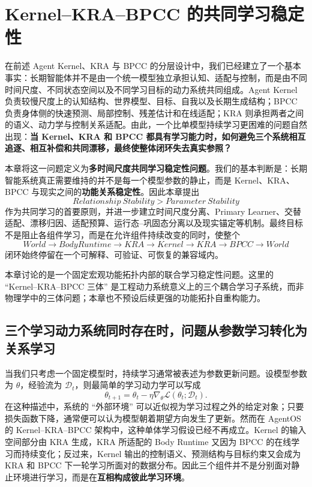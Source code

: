 \chapter{Kernel--KRA--BPCC 的共同学习稳定性}

\begin{chapterlead}
在前述 Agent Kernel、KRA 与 BPCC 的分层设计中，我们已经建立了一个基本事实：长期智能体并不是由一个统一模型独立承担认知、适配与控制，而是由不同时间尺度、不同状态空间以及不同学习目标的动力系统共同组成。Agent Kernel 负责较慢尺度上的认知结构、世界模型、目标、自我以及长期生成结构；BPCC 负责身体侧的快速预测、局部控制、残差估计和在线适配；KRA 则承担两者之间的语义、动力学与控制关系适配。由此，一个比单模型持续学习更困难的问题自然出现：\textbf{当 Kernel、KRA 和 BPCC 都具有学习能力时，如何避免三个系统相互追逐、相互补偿和共同漂移，最终使整体闭环失去真实参照？}

本章将这一问题定义为\textbf{多时间尺度共同学习稳定性问题}。我们的基本判断是：长期智能系统真正需要维持的并不是每一个模型参数的静止，而是 Kernel、KRA、BPCC 与现实之间的\textbf{功能关系稳定性}。因此本章提出
\[
\boxed{
Relationship\ Stability > Parameter\ Stability
}
\]
作为共同学习的首要原则，并进一步建立时间尺度分离、Primary Learner、交替适配、漂移归因、适配预算、运行态--巩固态分离以及现实锚定等机制。最终目标不是阻止各组件学习，而是在允许组件持续改变的同时，使整个
\[
World\rightarrow BodyRuntime\rightarrow KRA\rightarrow Kernel
\rightarrow KRA\rightarrow BPCC\rightarrow World
\]
闭环始终停留在一个可解释、可验证、可恢复的兼容域内。

本章讨论的是一个固定宏观功能拓扑内部的联合学习稳定性问题。这里的 ``Kernel--KRA--BPCC 三体'' 是工程动力系统意义上的三个耦合学习子系统，而非物理学中的三体问题；本章也不预设后续更强的功能拓扑自重构能力。
\end{chapterlead}


\section{三个学习动力系统同时存在时，问题从参数学习转化为关系学习}

当我们只考虑一个固定模型时，持续学习通常被表述为参数更新问题。设模型参数为 $\theta$，经验流为 $\mathcal{D}_t$，则最简单的学习动力学可以写成
\[
\theta_{t+1}
=
\theta_t
-
\eta \nabla_{\theta}\mathcal{L}
\left(
\theta_t;\mathcal{D}_t
\right).
\]
在这种描述中，系统的 ``外部环境'' 可以近似视为学习过程之外的给定对象；只要损失函数下降，通常便可以认为模型朝着期望方向发生了更新。然而在 AgentOS 的 Kernel--KRA--BPCC 架构中，这种单体学习假设已经不再成立。Kernel 的输入空间部分由 KRA 生成，KRA 所适配的 Body Runtime 又因为 BPCC 的在线学习而持续变化；反过来，Kernel 输出的控制语义、预测结构与目标约束又会成为 KRA 和 BPCC 下一轮学习所面对的数据分布。因此三个组件并不是分别面对静止环境进行学习，而是在\textbf{互相构成彼此学习环境}。

